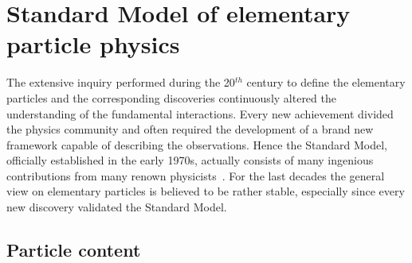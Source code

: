 \section{Standard Model of elementary particle physics} \label{sec::SM}
The extensive inquiry performed during the 20$^{th}$ century to define the elementary particles and the corresponding discoveries continuously altered the understanding of the fundamental interactions.
Every new achievement divided the physics community and often required the development of a brand new framework capable of describing the observations.
Hence the Standard Model, officially established in the early 1970s, actually consists of many ingenious contributions from many renown physicists~\cite{MandlAndShaw, PeskinAndSchroeder, Paschos:2007pi}. 
For the last decades the general view on elementary particles is believed to be rather stable, especially since every new discovery validated the Standard Model.

\subsection{Particle content}


